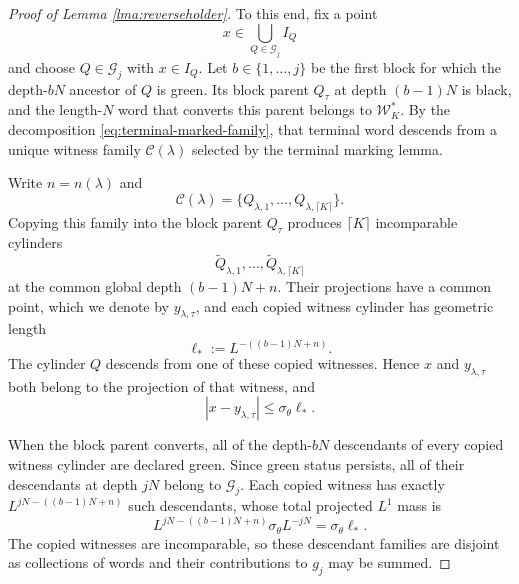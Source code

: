 \documentclass[12pt]{amsart}
\numberwithin{equation}{section}
\begin{document}
\begin{proof}[Proof of Lemma \ref{lma:reverseholder}]
To this end, fix a point
\[
 x\in\bigcup_{Q\in\mathscr G_j}I_Q
\]
and choose $Q\in\mathscr G_j$ with $x\in I_Q$.  Let $b\in\{1,\ldots,j\}$
be the first block for which the depth-$bN$ ancestor of $Q$ is green.  Its
block parent $Q_\tau$ at depth $(b-1)N$ is black, and the length-$N$ word
that converts this parent belongs to $\mathscr W_K^*$.  By the decomposition
\eqref{eq:terminal-marked-family}, that terminal word descends from a unique
witness family $\mathcal C(\lambda)$ selected by the terminal marking lemma.

Write $n=n(\lambda)$ and
\[
 \mathcal C(\lambda)
 =\{Q_{\lambda,1},\ldots,Q_{\lambda,\lceil K\rceil}\}.
\]
Copying this family into the block parent $Q_\tau$ produces
$\lceil K\rceil$ incomparable cylinders
\[
 \widetilde Q_{\lambda,1},\ldots,
 \widetilde Q_{\lambda,\lceil K\rceil}
\]
at the common global depth $(b-1)N+n$.  Their projections have a common
point, which we denote by $y_{\lambda,\tau}$, and each copied witness
cylinder has geometric length
\begin{equation}\label{eq:copied-witness-length}
 \ell_*:=L^{-((b-1)N+n)}.
\end{equation}
The cylinder $Q$ descends from one of these copied witnesses.  Hence $x$ and
$y_{\lambda,\tau}$ both belong to the projection of that witness, and
\begin{equation}\label{eq:green-point-distance}
 |x-y_{\lambda,\tau}|\leq\sigma_\theta\ell_*.
\end{equation}

When the block parent converts, all of the depth-$bN$ descendants of every
copied witness cylinder are declared green.  Since green status persists,
all of their descendants at depth $jN$ belong to $\mathscr G_j$.  Each copied
witness has exactly $L^{jN-((b-1)N+n)}$ such descendants, whose total
projected $L^1$ mass is
\begin{equation}\label{eq:one-witness-green-mass}
 L^{jN-((b-1)N+n)}\sigma_\theta L^{-jN}
 =\sigma_\theta\ell_*.
\end{equation}
The copied witnesses are incomparable, so these descendant families are
disjoint as collections of words and their contributions to $g_j$ may be
summed.


\end{proof}
\end{document}
